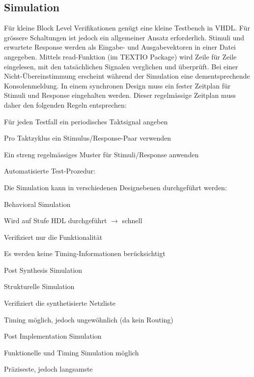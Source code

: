 \subsection{Simulation}
Für kleine Block Level Verifikationen genügt eine kleine Testbench in VHDL. Für grössere Schaltungen ist jedoch ein allgemeiner Ansatz erforderlich. Stimuli und erwartete Response werden als Eingabe- und Ausgabevektoren in einer Datei angegeben. Mittels read-Funktion (im TEXTIO Package) wird Zeile für Zeile eingelesen, mit den tatsächlichen Signalen verglichen und überprüft. Bei einer Nicht-Übereinstimmung erscheint während der Simulation eine dementsprechende Konsolenmeldung. In einem synchronen Design muss ein fester Zeitplan für Stimuli und Response eingehalten werden. Dieser regelmässige Zeitplan muss daher den folgenden Regeln entsprechen:
\begin{compactitem}
    \item Für jeden Testfall ein periodisches Taktsignal angeben
    \item Pro Taktzyklus ein Stimulus/Response-Paar verwenden
    \item Ein streng regelmässiges Muster für Stimuli/Response anwenden
\end{compactitem}
Automatisierte Test-Prozedur:

Die Simulation kann in verschiedenen Designebenen durchgeführt werden:
\begin{multicols}{3}
    \begin{compactitem}
        \item Behavioral Simulation
        \begin{compactitem}
            \item Wird auf Stufe HDL durchgeführt $\rightarrow$ schnell
            \item Verifiziert nur die Funktionalität
            \item Es werden keine Timing-Informationen berücksichtigt
        \end{compactitem}
        \item Post Synthesis Simulation
        \begin{compactitem}
            \item Strukturelle Simulation
            \item Verifiziert die synthetisierte Netzliste
            \item Timing möglich, jedoch ungewöhnlich (da kein Routing) \ \\
        \end{compactitem}
        \item Post Implementation Simulation
        \begin{compactitem}
            \item Funktionelle und Timing Simulation möglich
            \item Präziseste, jedoch langsamste
        \end{compactitem} \ \\
    \end{compactitem}
\end{multicols}

